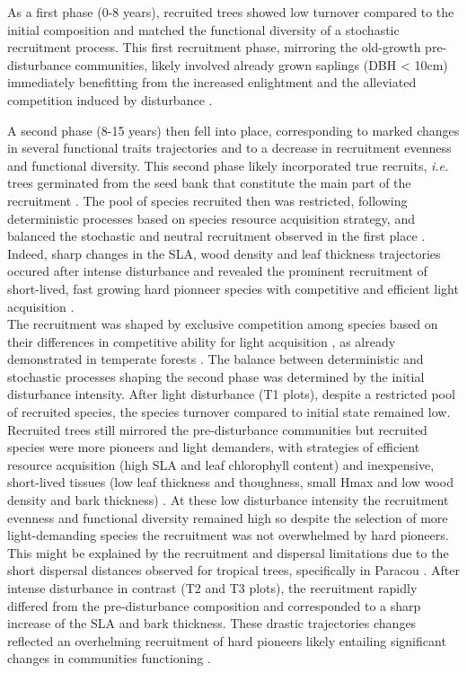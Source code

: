 \documentclass[fleqn,10pt]{ArtEcoFoG} %
\begin{document}
As a first phase (0-8 years), recruited trees showed low turnover
compared to the initial composition and matched the functional diversity
of a stochastic recruitment process. This first recruitment phase,
mirroring the old-growth pre-disturbance communities, likely involved
already grown saplings (DBH \textless{} 10cm) immediately benefitting
from the increased enlightment and the alleviated competition induced by
disturbance \citep{Herault2010}.

A second phase (8-15 years) then fell into place, corresponding to
marked changes in several functional traits trajectories and to a
decrease in recruitment evenness and functional diversity. This second
phase likely incorporated true recruits, \emph{i.e.} trees germinated
from the seed bank that constitute the main part of the recruitment
\citep{Lawton1988}. The pool of species recruited then was restricted,
following deterministic processes based on species resource acquisition
strategy, and balanced the stochastic and neutral recruitment observed
in the first place \citep{Chave2004}. Indeed, sharp changes in the SLA,
wood density and leaf thickness trajectories occured after intense
disturbance and revealed the prominent recruitment of short-lived, fast
growing hard pionneer species with competitive and efficient light
acquisition \citep{Wright2004, Chave2009b, Herault2011, Reich2014}.\\
The recruitment was shaped by exclusive competition among species based
on their differences in competitive ability for light acquisition
\citep{Mayfield2010}, as already demonstrated in temperate forests
\citep{Kunstler2012}. The balance between deterministic and stochastic
processes shaping the second phase was determined by the initial
disturbance intensity. After light disturbance (T1 plots), despite a
restricted pool of recruited species, the species turnover compared to
initial state remained low. Recruited trees still mirrored the
pre-disturbance communities but recruited species were more pioneers and
light demanders, with strategies of efficient resource acquisition (high
SLA and leaf chlorophyll content) and inexpensive, short-lived tissues
(low leaf thickness and thoughness, small Hmax and low wood density and
bark thickness)
\citep{Hubbell1999, Schnitzer2001, Sheil2003, Bongers2009}. At these low
disturbance intensity the recruitment evenness and functional diversity
remained high so despite the selection of more light-demanding species
the recruitment was not overwhelmed by hard pioneers. This might be
explained by the recruitment and dispersal limitations due to the short
dispersal distances observed for tropical trees, specifically in Paracou
\citep{Leclerc2015, Scotti2015a}. After intense disturbance in contrast
(T2 and T3 plots), the recruitment rapidly differed from the
pre-disturbance composition and corresponded to a sharp increase of the
SLA and bark thickness. These drastic trajectories changes reflected an
overhelming recruitment of hard pioneers likely entailing significant
changes in communities functioning \citep{Diaz2005}.
\end{document}
